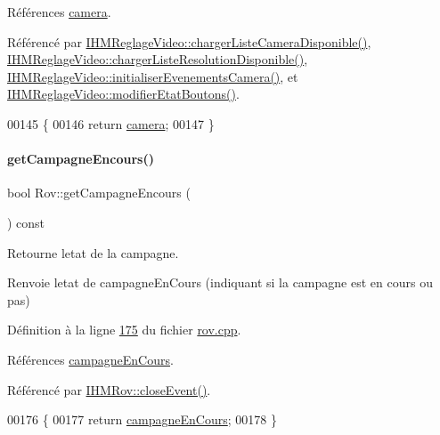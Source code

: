 Références \hyperlink{rov_8h_source_l00096}{camera}.



Référencé par \hyperlink{ihmreglagevideo_8cpp_source_l00132}{I\+H\+M\+Reglage\+Video\+::charger\+Liste\+Camera\+Disponible()}, \hyperlink{ihmreglagevideo_8cpp_source_l00179}{I\+H\+M\+Reglage\+Video\+::charger\+Liste\+Resolution\+Disponible()}, \hyperlink{ihmreglagevideo_8cpp_source_l00117}{I\+H\+M\+Reglage\+Video\+::initialiser\+Evenements\+Camera()}, et \hyperlink{ihmreglagevideo_8cpp_source_l00212}{I\+H\+M\+Reglage\+Video\+::modifier\+Etat\+Boutons()}.


\begin{DoxyCode}
00145 \{
00146     \textcolor{keywordflow}{return} \hyperlink{class_rov_ad0461ecece812497ee9b4a962f168c18}{camera};
00147 \}
\end{DoxyCode}
\mbox{\label{class_rov_a59d1a6d2ca83324e6efc0b74f2cff686}} 
\paragraph{\texorpdfstring{get\+Campagne\+Encours()}{getCampagneEncours()}}
{\footnotesize\ttfamily bool Rov\+::get\+Campagne\+Encours (\begin{DoxyParamCaption}{ }\end{DoxyParamCaption}) const}



Retourne l\textquotesingle{}etat de la campagne. 

\begin{DoxyReturn}{Renvoie}
l\textquotesingle{}etat de campagne\+En\+Cours (indiquant si la campagne est en cours ou pas) 
\end{DoxyReturn}


Définition à la ligne \hyperlink{rov_8cpp_source_l00175}{175} du fichier \hyperlink{rov_8cpp_source}{rov.\+cpp}.



Références \hyperlink{rov_8h_source_l00110}{campagne\+En\+Cours}.



Référencé par \hyperlink{ihmrov_8cpp_source_l00239}{I\+H\+M\+Rov\+::close\+Event()}.


\begin{DoxyCode}
00176 \{
00177     \textcolor{keywordflow}{return} \hyperlink{class_rov_abc9d61d10d8fb5e99283d3775baf98a8}{campagneEnCours};
00178 \}
\end{DoxyCode}
\mbox{\label{class_rov_a7e231245b39e7cc8026324e337b34c64}} 
